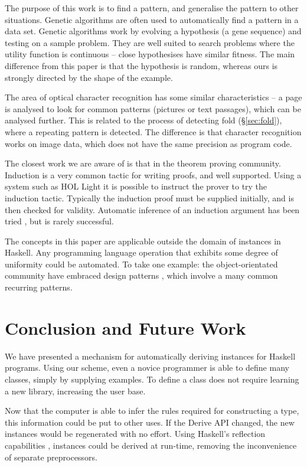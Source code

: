 \documentclass{llncs}
\begin{document}
The purpose of this work is to find a pattern, and generalise the pattern to other situations. Genetic algorithms \cite{genetic_algorithms} are often used to automatically find a pattern in a data set. Genetic algorithms work by evolving a hypothesis (a gene sequence) and testing on a sample problem. They are well suited to search problems where the utility function is continuous -- close hypothesises have similar fitness. The main difference from this paper is that the hypothesis is random, whereas ours is strongly directed by the shape of the example.

The area of optical character recognition \cite{ocr} has some similar characteristics -- a page is analysed to look for common patterns (pictures or text passages), which can be analysed further. This is related to the process of detecting fold (\S\ref{sec:fold}), where a repeating pattern is detected. The difference is that character recognition works on image data, which does not have the same precision as program code.

The closest work we are aware of is that in the theorem proving community. Induction is a very common tactic for writing proofs, and well supported. Using a system such as HOL Light \cite{hol_light} it is possible to instruct the prover to try the induction tactic. Typically the induction proof must be supplied initially, and is then checked for validity. Automatic inference of an induction argument has been tried \cite{mintchev:reasoning}, but is rarely successful.

The concepts in this paper are applicable outside the domain of instances in Haskell. Any programming language operation that exhibits some degree of uniformity could be automated. To take one example: the object-orientated community have embraced design patterns \cite{design_patterns}, which involve a many common recurring patterns.

\section{Conclusion and Future Work}
\label{sec:conclusion}

We have presented a mechanism for automatically deriving instances for Haskell programs. Using our scheme, even a novice programmer is able to define many classes, simply by supplying examples. To define a class does not require learning a new library, increasing the user base.

Now that the computer is able to infer the rules required for constructing a type, this information could be put to other uses. If the Derive API changed, the new instances would be regenerated with no effort. Using Haskell's reflection capabilities \cite{lammel:syb2}, instances could be derived at run-time, removing the inconvenience of separate preprocessors.
\end{document}
